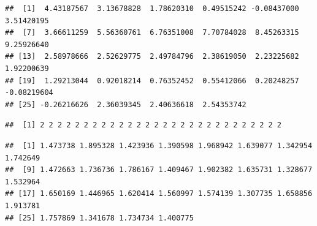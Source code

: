 \documentclass[
]{krantz}
\makeatletter
\newenvironment{Shaded}{\begin{snugshade}}{\end{snugshade}}
\newcommand{\CommentTok}[1]{\textcolor[rgb]{0.56,0.35,0.01}{\textit{#1}}}
\newcommand{\DataTypeTok}[1]{\textcolor[rgb]{0.13,0.29,0.53}{#1}}
\newcommand{\DecValTok}[1]{\textcolor[rgb]{0.00,0.00,0.81}{#1}}
\newcommand{\FloatTok}[1]{\textcolor[rgb]{0.00,0.00,0.81}{#1}}
\newcommand{\KeywordTok}[1]{\textcolor[rgb]{0.13,0.29,0.53}{\textbf{#1}}}
\newcommand{\NormalTok}[1]{#1}
\newcommand{\OperatorTok}[1]{\textcolor[rgb]{0.81,0.36,0.00}{\textbf{#1}}}
\newcommand{\StringTok}[1]{\textcolor[rgb]{0.31,0.60,0.02}{#1}}
\newenvironment{kframe}{%
\medskip{}
\setlength{\fboxsep}{.8em}
 \def\at@end@of@kframe{}%
 \ifinner\ifhmode%
  \def\at@end@of@kframe{\end{minipage}}%
  \begin{minipage}{\columnwidth}%
 \fi\fi%
 \def\FrameCommand##1{\hskip\@totalleftmargin \hskip-\fboxsep
 \colorbox{shadecolor}{##1}\hskip-\fboxsep
     \hskip-\linewidth \hskip-\@totalleftmargin \hskip\columnwidth}%
 \MakeFramed {\advance\hsize-\width
   \@totalleftmargin\z@ \linewidth\hsize
   \@setminipage}}%
 {\par\unskip\endMakeFramed%
 \at@end@of@kframe}
\renewenvironment{Shaded}{\begin{kframe}}{\end{kframe}}
\makeatother
\begin{document}
\begin{verbatim}
##  [1]  4.43187567  3.13678828  1.78620310  0.49515242 -0.08437000  3.51420195
##  [7]  3.66611259  5.56360761  6.76351008  7.70784028  8.45263315  9.25926640
## [13]  2.58978666  2.52629775  2.49784796  2.38619050  2.23225682  1.92200639
## [19]  1.29213044  0.92018214  0.76352452  0.55412066  0.20248257 -0.08219604
## [25] -0.26216626  2.36039345  2.40636618  2.54353742
\end{verbatim}

\begin{Shaded}
\end{Shaded}

\begin{verbatim}
##  [1] 2 2 2 2 2 2 2 2 2 2 2 2 2 2 2 2 2 2 2 2 2 2 2 2 2 2 2 2
\end{verbatim}

\begin{Shaded}
\end{Shaded}

\begin{verbatim}
##  [1] 1.473738 1.895328 1.423936 1.390598 1.968942 1.639077 1.342954 1.742649
##  [9] 1.472663 1.736736 1.786167 1.409467 1.902382 1.635731 1.328677 1.532964
## [17] 1.650169 1.446965 1.620414 1.560997 1.574139 1.307735 1.658856 1.913781
## [25] 1.757869 1.341678 1.734734 1.400775
\end{verbatim}
\end{document}
